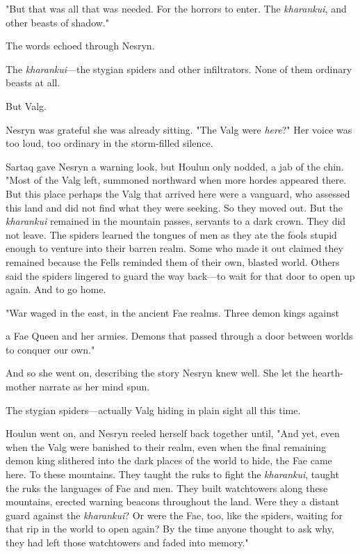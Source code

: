 "But that was all that was needed. For the horrors to enter. The
\emph{kharankui}, and other beasts of shadow."

The words echoed through Nesryn.

The \emph{kharankui}---the stygian spiders  and other infiltrators. None of them ordinary beasts at all.

But Valg.

Nesryn was grateful she was already sitting. "The Valg were
\emph{here}?" Her voice was too loud, too ordinary in the storm-filled silence.

Sartaq gave Nesryn a warning look, but Houlun only nodded, a jab of the chin. "Most of the Valg left, summoned northward when more hordes appeared there. But this place  perhaps the Valg that arrived here were a vanguard, who assessed this land and did not find what they were seeking. So they moved out. But the \emph{kharankui} remained in the mountain passes, servants to a dark crown. They did not leave. The spiders learned the tongues of men as they ate the fools stupid enough to venture into their barren realm. Some who made it out claimed they remained because the Fells reminded them of their own, blasted world. Others said the spiders lingered to guard the way back---to wait for that door to open up again. And to go home.

"War waged in the east, in the ancient Fae realms. Three demon kings against

a Fae Queen and her armies. Demons that passed through a door between worlds to conquer our own."

And so she went on, describing the story Nesryn knew well. She let the hearth-mother narrate as her mind spun.

The stygian spiders---actually Valg hiding in plain sight all this time.

Houlun went on, and Nesryn reeled herself back together until, "And yet, even when the Valg were banished to their realm, even when the final remaining demon king slithered into the dark places of the world to hide, the Fae came here. To these mountains. They taught the ruks to fight the \emph{kharankui}, taught the ruks the languages of Fae and men. They built watchtowers along these mountains, erected warning beacons throughout the land. Were they a distant guard against the
\emph{kharankui}? Or were the Fae, too, like the spiders, waiting for that rip in the world to open again? By the time anyone thought to ask why, they had left those watchtowers and faded into memory."

